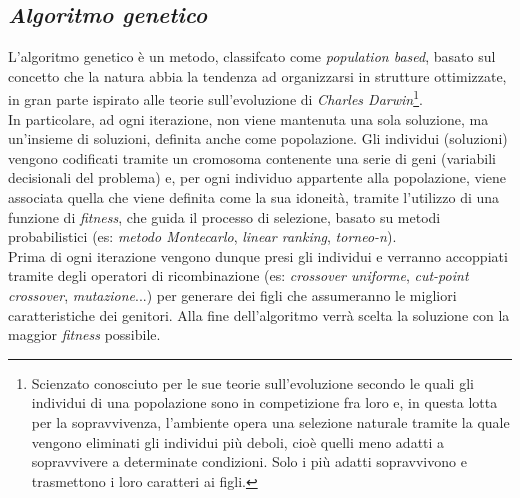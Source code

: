 \subsection{\textit{Algoritmo genetico}}
\noindent L'algoritmo genetico è un metodo, classifcato come \textit{population based}, basato sul concetto che la natura
abbia la tendenza ad organizzarsi in strutture ottimizzate, in gran parte ispirato
alle teorie sull'evoluzione di \textit{Charles Darwin}\footnote[4]{Scienzato conosciuto
per le sue teorie sull'evoluzione secondo le quali gli individui di una
popolazione sono in competizione fra loro e, in questa
lotta per la sopravvivenza, l'ambiente opera una selezione naturale tramite la quale
vengono eliminati gli individui più deboli, cioè quelli meno adatti a sopravvivere a determinate
condizioni. Solo i più adatti sopravvivono e trasmettono i loro
caratteri ai figli.}.\\
\noindent In particolare, ad ogni iterazione, non viene mantenuta una sola soluzione, ma un'insieme di soluzioni, definita anche come popolazione.
Gli individui (soluzioni) vengono codificati tramite un cromosoma contenente una serie di geni (variabili decisionali del problema) e, per
ogni individuo appartente alla popolazione, viene associata quella che viene definita come la sua idoneità, tramite l'utilizzo di una
funzione di \textit{fitness}, che guida il processo di selezione, basato su metodi probabilistici (es: \textit{metodo Montecarlo}, \textit{linear ranking}, \textit{torneo-n}).\\
Prima di ogni iterazione vengono dunque presi gli individui e verranno accoppiati tramite degli operatori di ricombinazione
(es: \textit{crossover uniforme}, \textit{cut-point crossover}, \textit{mutazione}...)
per generare dei figli che assumeranno le migliori caratteristiche dei genitori. Alla fine dell'algoritmo verrà scelta la soluzione con la maggior \textit{fitness} possibile.\\

